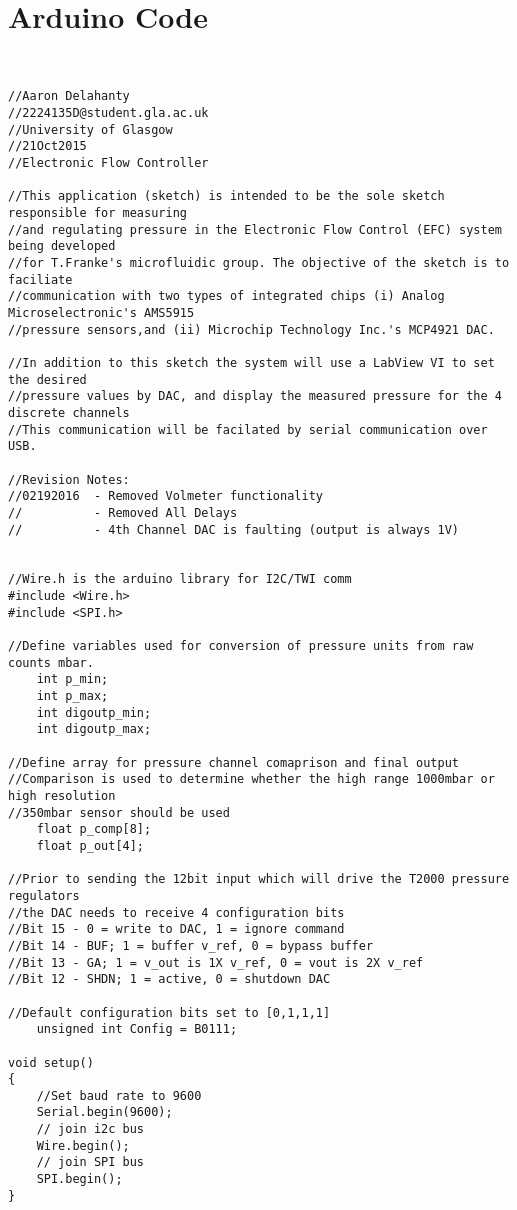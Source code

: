 \chapter{Arduino Code}
\label{chp:arduino}
\scriptsize

\begin{lstlisting}

    
//Aaron Delahanty
//2224135D@student.gla.ac.uk
//University of Glasgow
//21Oct2015
//Electronic Flow Controller

//This application (sketch) is intended to be the sole sketch responsible for measuring 
//and regulating pressure in the Electronic Flow Control (EFC) system being developed 
//for T.Franke's microfluidic group. The objective of the sketch is to faciliate
//communication with two types of integrated chips (i) Analog Microselectronic's AMS5915
//pressure sensors,and (ii) Microchip Technology Inc.'s MCP4921 DAC.

//In addition to this sketch the system will use a LabView VI to set the desired 
//pressure values by DAC, and display the measured pressure for the 4 discrete channels
//This communication will be facilated by serial communication over USB.

//Revision Notes:
//02192016  - Removed Volmeter functionality
//          - Removed All Delays
//          - 4th Channel DAC is faulting (output is always 1V)


//Wire.h is the arduino library for I2C/TWI comm
#include <Wire.h>
#include <SPI.h>

//Define variables used for conversion of pressure units from raw counts mbar.
    int p_min;
    int p_max;
    int digoutp_min;
    int digoutp_max;

//Define array for pressure channel comaprison and final output
//Comparison is used to determine whether the high range 1000mbar or high resolution 
//350mbar sensor should be used
    float p_comp[8];
    float p_out[4];

//Prior to sending the 12bit input which will drive the T2000 pressure regulators
//the DAC needs to receive 4 configuration bits
//Bit 15 - 0 = write to DAC, 1 = ignore command
//Bit 14 - BUF; 1 = buffer v_ref, 0 = bypass buffer
//Bit 13 - GA; 1 = v_out is 1X v_ref, 0 = vout is 2X v_ref
//Bit 12 - SHDN; 1 = active, 0 = shutdown DAC

//Default configuration bits set to [0,1,1,1]
    unsigned int Config = B0111;

void setup()
{
    //Set baud rate to 9600 
    Serial.begin(9600);
    // join i2c bus
    Wire.begin(); 
    // join SPI bus
    SPI.begin();
}


\end{lstlisting}

